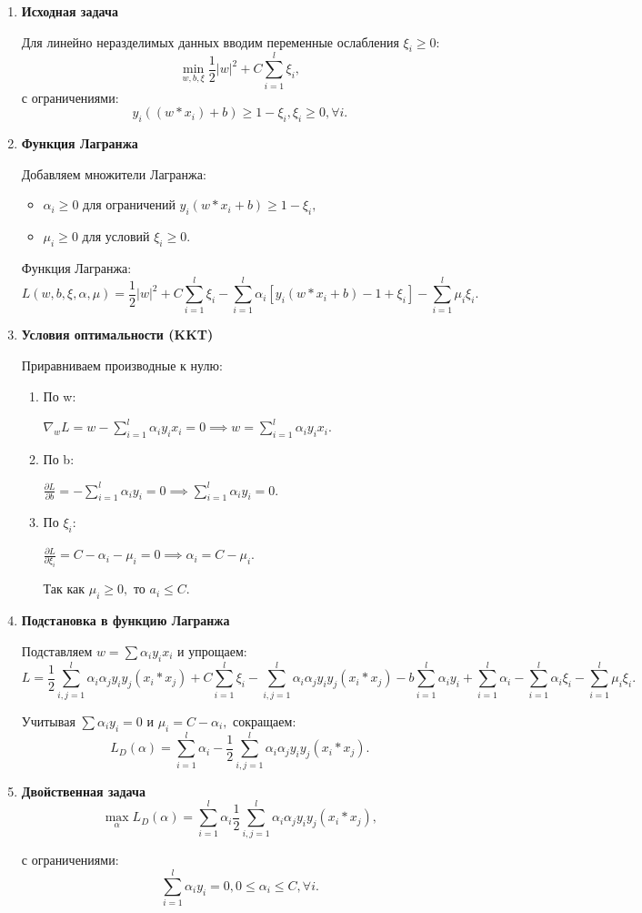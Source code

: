 \begin{enumerate}
    \item \textbf{Исходная задача}
    
    Для линейно неразделимых данных вводим переменные ослабления $\xi_i \geq 0:$ $$\min_{w,b,\xi}\frac{1}{2}|w|^2+C\sum_{i=1}^l\xi_i,$$
    с ограничениями: $$y_i((w*x_i)+b)\geq1-\xi_i,\xi_i\geq0, \forall i.$$
    \item \textbf{Функция Лагранжа}

    Добавляем множители Лагранжа:
\begin{itemize}
    \item $\alpha_i \geq 0$ для ограничений $y_i(w*x_i+b)\geq1-\xi_i,$
    \item $\mu_i \geq 0$ для условий $\xi_i \geq 0.$
\end{itemize}

Функция Лагранжа:
$$L(w,b,\xi,\alpha,\mu)=\frac{1}{2}|w|^2+C\sum_{i=1}^l\xi_i-\sum_{i=1}^l\alpha_i[y_i(w*x_i+b)-1+\xi_i]-\sum_{i=1}^l\mu_i\xi_i.$$
\item \textbf{Условия оптимальности (KKT)}

Приравниваем производные к нулю:
\begin{enumerate}
    \item По w:
    
    $\nabla_wL = w-\sum_{i=1}^l\alpha_iy_ix_i=0 \implies w=\sum_{i=1}^l\alpha_iy_ix_i.$
    \item По b:

    $\frac{\partial L}{\partial b}=-\sum_{i=1}^l\alpha_iy_i=0 \implies \sum_{i=1}^l\alpha_iy_i=0.$
    \item По $\xi_i:$

    $\frac{\partial L}{\partial \xi_i}=C-\alpha_i-\mu_i=0 \implies\alpha_i=C-\mu_i.$

    Так как $\mu_i \geq 0,$ то $a_i \leq C.$
\end{enumerate}
\item \textbf{Подстановка в функцию Лагранжа}

Подставляем $w = \sum\alpha_iy_ix_i$ и упрощаем:
$$L=\frac{1}{2}\sum_{i,j=1}^l\alpha_i\alpha_jy_iy_j(x_i*x_j)+C\sum_{i=1}^l\xi_i - \sum_{i,j=1}^l\alpha_i\alpha_jy_iy_j(x_i*x_j)-b\sum_{i=1}^l\alpha_iy_i+\sum_{i=1}^l\alpha_i-\sum_{i=1}^l\alpha_i\xi_i-\sum_{i=1}^l\mu_i\xi_i.$$

Учитывая $\sum\alpha_iy_i=0$ и $\mu_i=C-\alpha_i,$ сокращаем:
$$L_D(\alpha)=\sum_{i=1}^l\alpha_i-\frac{1}{2}\sum_{i,j=1}^l\alpha_i\alpha_jy_iy_j(x_i*x_j).$$
\item \textbf{Двойственная задача}
$$\max_\alpha L_D(\alpha)=\sum_{i=1}^l\alpha_i\frac{1}{2}\sum_{i,j=1}^l\alpha_i\alpha_jy_iy_j(x_i*x_j),$$

с ограничениями:
$$\sum_{i=1}^l\alpha_iy_i=0, 0\leq \alpha_i \leq C, \forall i.$$
\end{enumerate}
